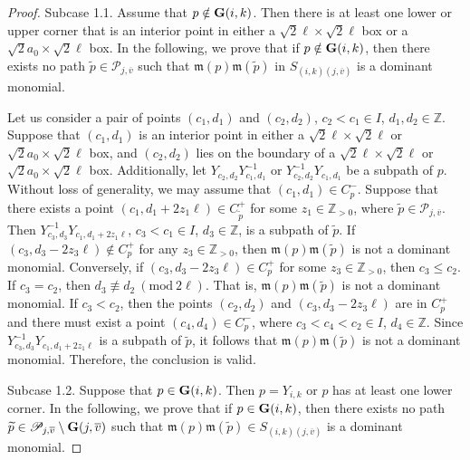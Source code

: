\documentclass[12pt, reqno]{amsart}
\numberwithin{equation}{section}
\newcommand{\ZZ}{\mathbb{Z}}
\begin{document}
{\begin{proof}
Subcase 1.1. Assume that $p\notin{\bf G}(i,k)$. Then there is at least one lower or upper corner that is an interior point in either a $\sqrt{2}\ell \times \sqrt{2}\ell$ box or a $\sqrt{2}a_0 \times \sqrt{2}\ell$ box.
In the following, we prove that if $p\notin{\bf G}(i,k)$, then there exists no path $\widetilde{p}\in \mathscr{P}_{j, \overline{v}}$ such that $\mathfrak{m}(p)\mathfrak{m}(\widetilde{p})$ in $S_{(i, k)(j, \overline{v})}$ is a dominant monomial.

Let us consider a pair of points $(c_1,d_1)$ and $(c_2,d_2)$, $c_2<c_1 \in I$, $d_1, d_2 \in \ZZ$. Suppose that $(c_1,d_1)$ is an interior point in either a $\sqrt{2}\ell \times \sqrt{2}\ell$ or $\sqrt{2}a_0 \times \sqrt{2}\ell$ box, and $(c_2,d_2)$ lies on the boundary of a $\sqrt{2}\ell \times \sqrt{2}\ell$ or $\sqrt{2}a_0 \times \sqrt{2}\ell$ box. Additionally, let $Y_{c_2, d_2}Y_{c_1, d_1}^{-1}$ or $Y_{c_2, d_2}^{-1}Y_{c_1, d_1}$ be a subpath of $p$. Without loss of generality, we may assume that $(c_1, d_1)\in C^{-}_p$. Suppose that there exists a point $(c_1, d_1+2z_1 \ell)\in C^{+}_{\widetilde{p}}$ for some $z_1 \in\ZZ_{>0}$, where $\widetilde{p}\in \mathscr{P}_{j,\overline{v}}$. Then $Y_{c_3,d_3}^{-1}Y_{c_1,d_1+2z_1 \ell}$, $c_3<c_1 \in I$, $d_3 \in \ZZ$, is a subpath of $\widetilde{p}$. If $(c_3,d_3-2z_3 \ell) \not\in C^{+}_p$ for any $z_3 \in\ZZ_{>0}$, then $\mathfrak{m}(p)\mathfrak{m}(\widetilde{p})$ is not a dominant monomial. Conversely, if $(c_3, d_3-2z_3 \ell) \in C^{+}_p$ for some $z_3 \in\ZZ_{>0}$, then $c_3\leq c_2$. If $c_3=c_2$, then $d_3 \not\equiv d_2\ (\text{mod}\ 2 \ell)$. That is, $\mathfrak{m}(p)\mathfrak{m}(\widetilde{p})$ is not a dominant monomial. If $c_3<c_2$, then the points $(c_2,d_2)$ and $(c_3,d_3-2z_3 \ell)$ are in $C^{+}_p$ and there must exist a point $(c_4,d_4)\in C^{-}_p$, where $c_3<c_4<c_2\in I$, $d_4 \in \ZZ$. Since $Y_{c_3,d_3}^{-1}Y_{c_1,d_1+2z_1 \ell}$ is a subpath of $\widetilde{p}$, it follows that $\mathfrak{m}(p)\mathfrak{m}(\widetilde{p})$ is not a dominant monomial. Therefore, the conclusion is valid.



Subcase 1.2. Suppose that $p \in {\bf G}(i,k)$. Then $p=Y_{i,k}$ or $p$ has at least one lower corner. In the following, we prove that if $p \in {\bf G}(i,k)$, then there exists no path $\widetilde{p}\in \mathscr{P}_{j, \overline{v}}\setminus{\bf G}(j,\overline{v})$ such that $\mathfrak{m}(p)\mathfrak{m}(\widetilde{p}) \in S_{(i, k)(j, \overline{v})}$ is a dominant monomial.


\end{proof}}
\end{document}
